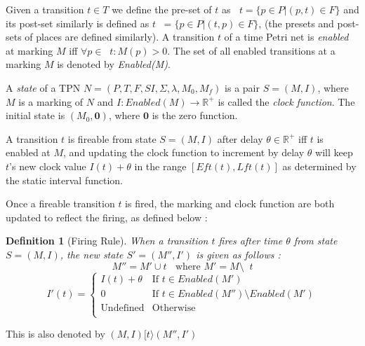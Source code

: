 \documentclass[conference]{IEEEtran}
\newcounter{cases}
\DeclareMathOperator*{\pre}{^\bullet}
\newtheorem{definition}{Definition}
\begin{document}
	Given a transition $t \in T$ we define the pre-set of $t$ as $\pre t = \{p \in P | (p, t) \in F\}$ and its post-set similarly is defined as $t \pre = \{p \in P | (t, p) \in F\}$, (the presets and post-sets of places are defined similarly). A transition $t$ of a time Petri net is \textit{enabled} at marking $M$ iff $\forall p \in \pre t :  M(p) > 0$. 
	The set of all enabled transitions at a marking $M$ is denoted by \textit{Enabled(M)}. 
	
	A \textit{state} of a TPN $N = (P, T, F, SI, \Sigma, \lambda, M_0, M_f)$ is a pair $S = (M, I)$, where $M$ is a marking of $N$ and $I : Enabled(M) \rightarrow \mathbb{R^+}$ is called the \textit{clock function}. The initial state is $(M_0, \mathbf{0})$, where $\mathbf{0} $ is the zero function. 
	
	A transition $t$ is fireable from state $S = (M, I)$ after delay $\theta \in \mathbb{R}^+$ iff $t$ is enabled at $M$, and updating the clock function to increment by delay $\theta$ will keep $t$'s new clock value $I(t)  + \theta$ in the range $[Eft(t), Lft(t)]$ as determined by the static interval function. 
	
	Once a fireable transition $t$ is fired, the marking and clock function are both updated to reflect the firing, as defined below : %
	
	\begin{definition}[Firing Rule]
		When a transition $t$ fires after time $\theta$ from state $S = (M, I)$, the new state $S' = (M'', I')$ is given as follows : $$M'' = M' \cup t \pre \textrm{ where } M' = M \setminus \pre t$$ $$I'(t) = \begin{cases}
			I(t) + \theta & \textrm{If } t \in Enabled(M')\\
			0 & \textrm{If } t \in Enabled(M'') \setminus Enabled(M')\\
			\textrm{Undefined} & \textrm{Otherwise}\\
		\end{cases}$$
	\end{definition}
	This is also denoted by $(M, I)[t\rangle(M'', I')$
	
\end{document}
